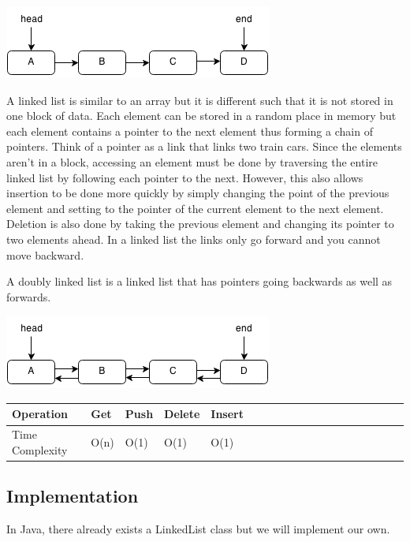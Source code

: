 \documentclass[11pt,oneside]{book}
\makeatletter
\def\maxwidth#1{\ifdim\Gin@nat@width>#1 #1\else\Gin@nat@width\fi}
\makeatother
\begin{document}
\includegraphics[width=\maxwidth{\textwidth}]{linkedlist.png}

A linked list is similar to an array but it is different such that it is not stored in one block of data. Each element can be stored in a random place in memory but each element contains a pointer to the next element thus forming a chain of pointers. Think of a pointer as a link that links two train cars. Since the elements aren't in a block, accessing an element must be done by traversing the entire linked list by following each pointer to the next. However, this also allows insertion to be done more quickly by simply changing the point of the previous element and setting to the pointer of the current element to the next element. Deletion is also done by taking the previous element and changing its pointer to two elements ahead. In a linked list the links only go forward and you cannot move backward.

A doubly linked list is a linked list that has pointers going backwards as well as forwards.

\includegraphics[width=\maxwidth{\textwidth}]{doublelinkedlist.png}

\vspace{10pt} \begin{tabular}{|l|l|l|l|l|l|l|l|l|l|l|l|l|l|l|l|l|l|l}\hline


  Operation &
  Get &
  Push &
  Delete &
  Insert\\
\hline


  Time Complexity &
  O(n) &
  O(1) &
  O(1) &
  O(1)\\

\hline\end{tabular}

\subsection{Implementation}

In Java, there already exists a LinkedList class but we will implement our own.
\end{document}
